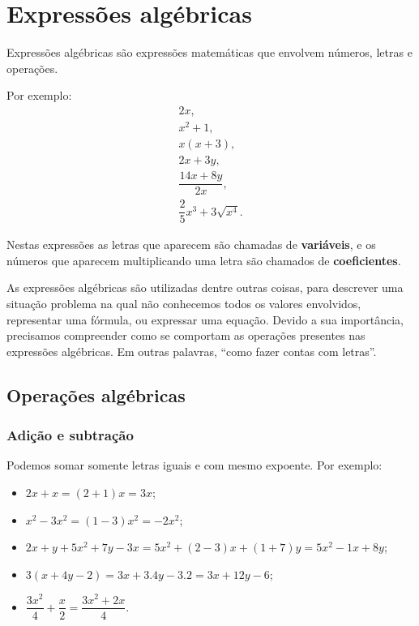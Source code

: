
\chapter{Expressões algébricas}

\begin{obs}
  Expressões algébricas são expressões matemáticas que envolvem números, letras e operações.
\end{obs}

 Por exemplo:
 \begin{gather*}
  2x,\\
  x^2+1,\\
  x(x+3),\\
  2x+3y,\\
  \dfrac{14x + 8y}{2x}, \\
  \dfrac{2}{5}x^3 + 3\sqrt{x^4}.
 \end{gather*}

 Nestas expressões as letras que aparecem são chamadas de \textbf{variáveis}, e os números que aparecem multiplicando uma letra são chamados de \textbf{coeficientes}.

 As expressões algébricas são utilizadas dentre outras coisas, para descrever uma situação problema na qual não conhecemos todos os valores envolvidos, representar uma fórmula, ou expressar uma equação. Devido a sua importância, precisamos compreender como se comportam as operações presentes nas expressões algébricas. Em outras palavras, ``como fazer contas com letras''.

\section{Operações algébricas}


\subsection{Adição e subtração}

 Podemos somar somente letras iguais e com mesmo expoente. Por exemplo:

 \begin{itemize}
  \item $2x + x= (2+1)x= 3x$;
  \item $x^2 - 3x^2= (1-3)x^2= -2x^2$;
  \item $2x + y + 5x^2 + 7y - 3x= 5x^2 + (2-3)x + (1+7)y= 5x^2 - 1x + 8y$;
  \item $3(x+ 4y-2)= 3x + 3.4y - 3.2= 3x + 12y - 6$;
  \item $\dfrac{3x^2}{4}+\dfrac{x}{2}= \dfrac{3x^2 + 2x}{4}$.
 \end{itemize}

